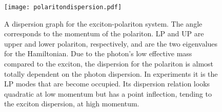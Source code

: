 \begin{figure}[htbp!]
	\centering
	\texttt{[image: polaritondispersion.pdf]}
	\caption{A dispersion graph for the exciton-polariton system. The angle corresponds to the momentum of the polariton. LP and UP are upper and lower polariton, respectively, and are the two eigenvalues for the Hamiltonian. Due to the photon's low effective mass compared to the exciton, the dispersion for the polariton is almost totally dependent on the photon dispersion. In experiments it is the LP modes that are become occupied. Its dispersion relation looks quadratic at low momentum but has a point inflection, tending to the exciton dispersion, at high momentum. \cite{doi:10.1080/00107514.2010.550120}}
	\label{fig:polaritondispersion}
\end{figure}


